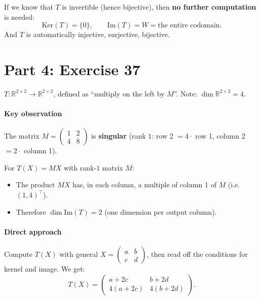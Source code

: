 \documentclass[a4paper,12pt]{article}
\begin{document}
\begin{merkbox}[title={Rule of thumb}]
If we know that $T$ is invertible (hence bijective), then \textbf{no further computation} is needed:
\[
\text{Ker}(T) = \{0\}, \qquad \text{Im}(T) = W = \text{the entire codomain}.
\]
And $T$ is automatically injective, surjective, bijective.
\end{merkbox}

\newpage

\part*{Part 4: Exercise 37}

$T \colon \mathbb{R}^{2\times 2} \to \mathbb{R}^{2\times 2}$, defined as ``multiply on the left by $M$''. Note: $\dim \mathbb{R}^{2\times 2} = 4$.

\subsection*{Key observation}

The matrix $M = \begin{pmatrix} 1 & 2 \\ 4 & 8 \end{pmatrix}$ is \textbf{singular} (rank $1$: row 2 $= 4 \cdot$ row 1, column 2 $= 2 \cdot$ column 1).

\begin{merkbox}[title={Consequence}]
For $T(X) = M X$ with rank-$1$ matrix $M$:
\begin{itemize}[nosep]
    \item The product $M X$ has, in each column, a multiple of column 1 of $M$ (i.e.\ $(1, 4)^\top$).
    \item Therefore $\dim \text{Im}(T) = 2$ (one dimension per output column).
\end{itemize}
\end{merkbox}

\subsection*{Direct approach}

Compute $T(X)$ with general $X = \begin{pmatrix} a & b \\ c & d \end{pmatrix}$, then read off the conditions for kernel and image. We get:
\[
T(X) = \begin{pmatrix} a + 2c & b + 2d \\ 4(a + 2c) & 4(b + 2d) \end{pmatrix}.
\]
\end{document}
